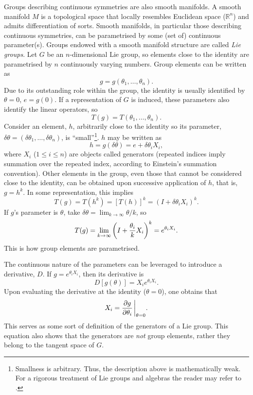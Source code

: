 Groups describing continuous symmetries are also smooth manifolds. A smooth manifold $M$ is a topological space that locally resembles Euclidean space ($\mathbb{R}^n$) and admits differentiation of sorts. Smooth manifolds, in particular those describing continuous symmetries, can be parametrised by some (set of) continuous parameter(s). Groups endowed with a smooth manifold structure are called \textit{Lie groups}. Let $G$ be an $n$-dimensional Lie group, so elements close to the identity are parametrised by $n$ continuously varying numbers. Group elements can be written as $$g = g(\theta_1,\dotsc,\theta_n).$$ Due to its outstanding role within the group, the identity is usually identified by $\theta = 0$, $e = g(0)$. If a representation of $G$ is induced, these parameters also identify the linear operators, so $$T(g) = T(\theta_1,\dotsc,\theta_n).$$ Consider an element, $h$, arbitrarily close to the identity so its parameter, $\delta \theta = (\delta\theta_1,\dotsc,\delta\theta_n)$, is ``small''\footnote{Smallness is arbitrary. Thus, the description above is mathematically weak. For a rigorous treatment of Lie groups and algebras the reader may refer to \cite{tu_introduction_2011}.}. $h$ may be written as $$h = g(\delta \theta) = e+\delta\theta_i X_i,$$ where $X_i$ ($1\leq i \leq n$) are objects called generators (repeated indices imply summation over the repeated index, according to Einstein's summation convention). Other elements in the group, even those that cannot be considered close to the identity, can be obtained upon successive application of $h$, that is, $g = h^k$. In some representation, this implies $$T(g) = T(h^k) = [T(h)]^k = (I+\delta\theta_i X_i)^k.$$ If $g$'s parameter is $\theta$, take $\delta\theta = \lim_{k\to \infty} \theta/k$, so $$T(g) = \lim_{k\to \infty} \qty(I+\frac{\theta_i}{k} X_i)^k = e^{\theta_i X_i}.$$ This is how group elements are parametrised.

The continuous nature of the parameters can be leveraged to introduce a derivative, $D$. If $g = e^{\theta_i X_i}$, then its derivative is $$D[g(\theta)] = X_i e^{\theta_i X_i}.$$ Upon evaluating the derivative at the identity ($\theta = 0$), one obtains that $$ X_i = \pdv{g}{\theta_i}\eval_{\theta = 0}.$$ This serves as some sort of definition of the generators of a Lie group. This equation also shows that the generators are \textit{not} group elements, rather they belong to the tangent space of $G$.

